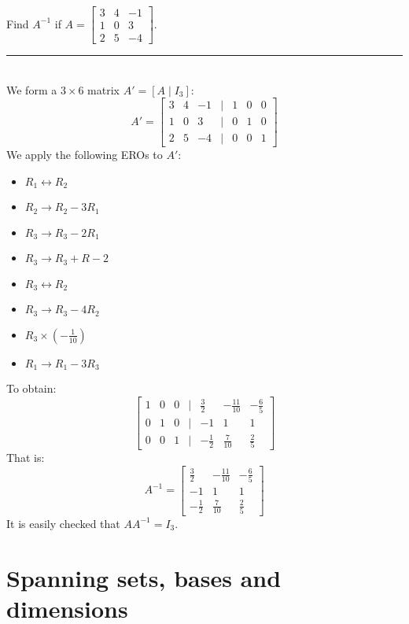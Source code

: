 \documentclass[a4paper, 9pt]{extarticle}
\begin{document}
\begin{examplebox}{}{}
  Find $A^{-1}$ if $A = \begin{bmatrix}
      3 & 4 & -1 \\
      1 & 0 & 3  \\
      2 & 5 & -4
    \end{bmatrix}$.
  \\[2ex] \rule{\textwidth}{1px} \\
  We form a $3 \times 6$ matrix $A' = [A \mid I_3]$:
  $$
    A' = \begin{bmatrix}
      3 & 4 & -1 & | & 1 & 0 & 0 \\
      1 & 0 & 3  & | & 0 & 1 & 0 \\
      2 & 5 & -4 & | & 0 & 0 & 1
    \end{bmatrix}
  $$
  We apply the following EROs to $A'$:
  \begin{itemize}
    \item $R_1 \leftrightarrow R_2$
    \item $R_2 \rightarrow R_2 - 3R_1$
    \item $R_3 \rightarrow R_3 - 2R_1$
    \item $R_3 \rightarrow R_3 + R-2$
    \item $R_3 \leftrightarrow R_2$
    \item $R_3 \rightarrow R_3 - 4R_2$
    \item $R_3 \times (-\frac{1}{10})$
    \item $R_1 \rightarrow R_1 - 3R_3$
  \end{itemize}
  To obtain:
  $$
    \begin{bmatrix}
      1 & 0 & 0 & | & \frac{3}{2}  & -\frac{11}{10} & -\frac{6}{5} \\
      0 & 1 & 0 & | & -1           & 1              & 1            \\
      0 & 0 & 1 & | & -\frac{1}{2} & \frac{7}{10}   & \frac{2}{5}
    \end{bmatrix}
  $$
  That is:
  $$A^{-1} = \begin{bmatrix}
      \frac{3}{2}  & -\frac{11}{10} & -\frac{6}{5} \\
      -1           & 1              & 1            \\
      -\frac{1}{2} & \frac{7}{10}   & \frac{2}{5}
    \end{bmatrix}$$
  It is easily checked that $AA^{-1} = I_3$.
\end{examplebox}
\pagebreak
\section{Spanning sets, bases and dimensions}
\end{document}
